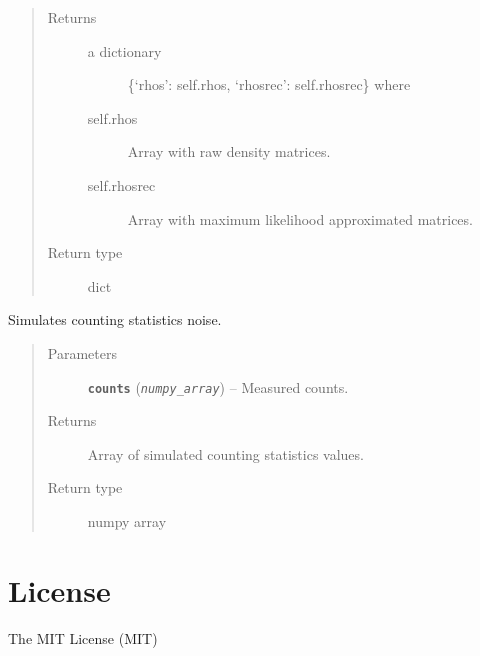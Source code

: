\documentclass[letterpaper,10pt,english]{sphinxmanual}
\begin{document}
\begin{fulllineitems}
\begin{fulllineitems}
\begin{quote}
\begin{description}
\item[{Returns}] \leavevmode
\begin{description}
\item[{a dictionary}] \leavevmode
\{`rhos': self.rhos, `rhosrec': self.rhosrec\} where

\item[{self.rhos}] \leavevmode
Array with raw density matrices.

\item[{self.rhosrec}] \leavevmode
Array with maximum likelihood approximated matrices.

\end{description}


\item[{Return type}] \leavevmode
dict

\end{description}\end{quote}

\end{fulllineitems}


\begin{fulllineitems}
\label{modules:Tomography.Errorize.sim_counts}
Simulates counting statistics noise.
\begin{quote}\begin{description}
\item[{Parameters}] \leavevmode
\textbf{\texttt{counts}} (\emph{\texttt{numpy\_array}}) -- Measured counts.

\item[{Returns}] \leavevmode
Array of simulated counting statistics values.

\item[{Return type}] \leavevmode
numpy array

\end{description}\end{quote}

\end{fulllineitems}


\end{fulllineitems}



\chapter{License}
\label{license::doc}\label{license:license}
The MIT License (MIT)
\end{document}
